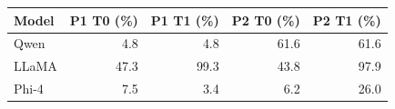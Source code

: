 \begin{tabular}{@{}lrrrr@{}}
\toprule
Model & P1 T0 (\%) & P1 T1 (\%) & P2 T0 (\%) & P2 T1 (\%) \\
\midrule
Qwen & 4.8 & 4.8 & 61.6 & 61.6 \\
LLaMA & 47.3 & 99.3 & 43.8 & 97.9 \\
Phi-4 & 7.5 & 3.4 & 6.2 & 26.0 \\
\bottomrule
\end{tabular}
